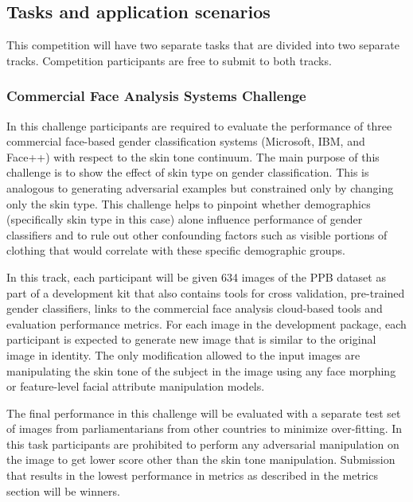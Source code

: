 \documentclass[11pt, oneside]{article}
\begin{document}
\subsection{Tasks and application scenarios}


This competition will have two separate tasks that are divided into two separate tracks. Competition participants are free to submit to both tracks. 

\subsubsection{Commercial Face Analysis Systems Challenge}
In this challenge participants are required to evaluate the performance of three commercial face-based gender classification systems (Microsoft, IBM, and Face++) with respect to the skin tone continuum. The main purpose of this challenge is to show the effect of skin type on gender classification. This is analogous to generating adversarial examples but constrained only by changing only the skin type. This challenge helps to pinpoint whether demographics (specifically skin type in this case) alone influence performance of gender classifiers and to rule out other confounding factors such as visible portions of clothing that would correlate with these specific demographic groups.

In this track, each participant will be given 634 images of the PPB dataset as part of a development kit that also contains tools for cross validation, pre-trained gender classifiers, links to the commercial face analysis cloud-based tools and evaluation performance metrics. For each image in the development package, each participant is expected to generate new image that is similar to the original image in identity. The only modification allowed to the input images are manipulating the skin tone of the subject in the image using any face morphing or feature-level facial attribute manipulation models. 

The final performance in this challenge will be evaluated with a separate test set of images from parliamentarians from other countries to minimize over-fitting. In this task participants are prohibited to perform any adversarial manipulation on the image to get lower score other than the skin tone manipulation. Submission that results in the lowest performance in metrics as described in the metrics section will be winners.
 
\end{document}
